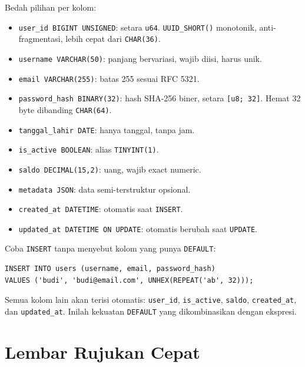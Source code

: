 \documentclass[11pt,a4paper]{article}
\begin{document}
Bedah pilihan per kolom:

\begin{itemize}
	\item \texttt{user\_id BIGINT UNSIGNED}: setara \texttt{u64}. \texttt{UUID\_SHORT()} monotonik, anti-fragmentasi, lebih cepat dari \texttt{CHAR(36)}.
	\item \texttt{username VARCHAR(50)}: panjang bervariasi, wajib diisi, harus unik.
	\item \texttt{email VARCHAR(255)}: batas 255 sesuai RFC 5321.
	\item \texttt{password\_hash BINARY(32)}: hash SHA-256 biner, setara \texttt{[u8; 32]}. Hemat 32 byte dibanding \texttt{CHAR(64)}.
	\item \texttt{tanggal\_lahir DATE}: hanya tanggal, tanpa jam.
	\item \texttt{is\_active BOOLEAN}: alias \texttt{TINYINT(1)}.
	\item \texttt{saldo DECIMAL(15,2)}: uang, wajib exact numeric.
	\item \texttt{metadata JSON}: data semi-terstruktur opsional.
	\item \texttt{created\_at DATETIME}: otomatis saat \texttt{INSERT}.
	\item \texttt{updated\_at DATETIME ON UPDATE}: otomatis berubah saat \texttt{UPDATE}.
\end{itemize}

Coba \texttt{INSERT} tanpa menyebut kolom yang punya \texttt{DEFAULT}:

\begin{lstlisting}[style=code]
INSERT INTO users (username, email, password_hash)
VALUES ('budi', 'budi@email.com', UNHEX(REPEAT('ab', 32)));
\end{lstlisting}

Semua kolom lain akan terisi otomatis: \texttt{user\_id}, \texttt{is\_active}, \texttt{saldo}, \texttt{created\_at}, dan \texttt{updated\_at}. Inilah kekuatan \texttt{DEFAULT} yang dikombinasikan dengan ekspresi.

\section{Lembar Rujukan Cepat}
\end{document}
